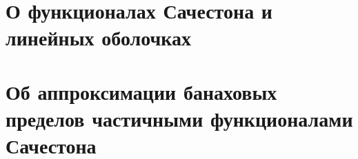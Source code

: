 \documentclass[a4paper,openbib]{report}
\theoremstyle{definition}
\newcommand\hypotlist{ }
\begin{document}
	\section{О функционалах Сачестона и линейных оболочках}
	
	

	\section{Об аппроксимации банаховых пределов частичными функционалами Сачестона}
	

\renewcommand\label[1]{}


\printbibliography{}
\end{document}
